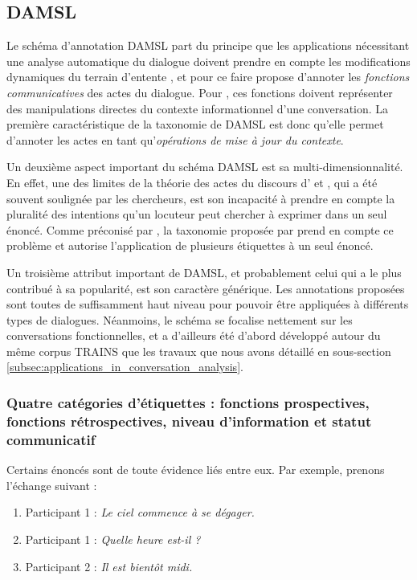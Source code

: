 \documentclass[10pt,a4paper,twoside]{article}
\begin{document}
\subsection{DAMSL}
\label{subsec:DAMSL}

Le schéma d'annotation DAMSL part du principe que les applications nécessitant une analyse automatique du dialogue doivent prendre en compte les modifications dynamiques du \og terrain d'entente \fg, et pour ce faire propose d'annoter les \textit{fonctions communicatives} des actes du dialogue. Pour \citet{core1997coding}, ces fonctions doivent représenter des manipulations directes du contexte informationnel d'une conversation. La première caractéristique de la taxonomie de DAMSL est donc qu'elle permet d'annoter les actes en tant qu'\textit{opérations de mise à jour du contexte}.

Un deuxième aspect important du schéma DAMSL est sa multi-dimensionnalité. En effet, une des limites de la théorie des actes du discours d'\citeauthor{austin1975how} et \citeauthor{searle1969speech}, qui a été souvent soulignée par les chercheurs, est son incapacité à prendre en compte la pluralité des intentions qu'un locuteur peut chercher à exprimer dans un seul énoncé. Comme préconisé par \citet{traum1992conversation}, la taxonomie proposée par \citeauthor{core1997coding} prend en compte ce problème et autorise l'application de plusieurs étiquettes à un seul énoncé.

Un troisième attribut important de DAMSL, et probablement celui qui a le plus contribué à sa popularité, est son caractère générique. Les annotations proposées sont toutes de suffisamment haut niveau pour pouvoir être appliquées à différents types de dialogues. Néanmoins, le schéma se focalise nettement sur les conversations fonctionnelles, et a d'ailleurs été d'abord développé autour du même corpus TRAINS que les travaux que nous avons détaillé en sous-section \ref{subsec:applications_in_conversation_analysis}.

\subsubsection{Quatre catégories d'étiquettes : fonctions prospectives, fonctions rétrospectives, niveau d'information et statut communicatif}

Certains énoncés sont de toute évidence liés entre eux. Par exemple, prenons l'échange suivant :

\begin{enumerate}
	\item Participant 1 : \og \textit{Le ciel commence à se dégager.} \fg
	\item Participant 1 : \og \textit{Quelle heure est-il ?} \fg
	\item Participant 2 : \og \textit{Il est bientôt midi.} \fg
\end{enumerate}
\end{document}
